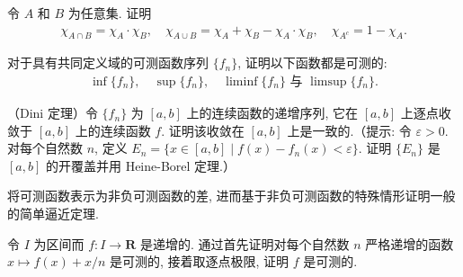 \documentclass[../../main.tex]{subfiles}
\begin{document}
\begin{exercise}\label{exercise:ch03-20}
令 $A$ 和 $B$ 为任意集. 证明
\begin{align*}
\chi_{A\cap B}=\chi_{A}\cdot\chi_{B},\quad\chi_{A\cup B}=\chi_{A}+\chi_{B}-\chi_{A}\cdot\chi_{B},\quad\chi_{A^{c}}=1-\chi_{A}.
\end{align*}
\end{exercise}

\begin{exercise}\label{exercise:ch03-21}
对于具有共同定义域的可测函数序列 $\{f_{n}\}$, 证明以下函数都是可测的:
\begin{align*}
\inf\{f_{n}\},\quad\sup\{f_{n}\},\quad\liminf\{f_{n}\}\text{ 与 }\limsup\{f_{n}\}.
\end{align*}
\end{exercise}

\begin{exercise}\label{exercise:ch03-22}
（Dini 定理）令 $\{f_{n}\}$ 为 $[a,b]$ 上的连续函数的递增序列, 它在 $[a,b]$ 上逐点收敛于 $[a,b]$ 上的连续函数 $f$. 证明该收敛在 $[a,b]$ 上是一致的.（提示: 令 $\varepsilon>0$. 对每个自然数 $n$, 定义 $E_{n}=\{x\in[a,b]\mid f(x)-f_{n}(x)<\varepsilon\}$. 证明 $\{E_{n}\}$ 是 $[a,b]$ 的开覆盖并用 Heine-Borel 定理.）
\end{exercise}

\begin{exercise}\label{exercise:ch03-23}
将可测函数表示为非负可测函数的差, 进而基于非负可测函数的特殊情形证明一般的简单逼近定理.
\end{exercise}

\begin{exercise}\label{exercise:ch03-24}
令 $I$ 为区间而 $f:I\to\mathbf{R}$ 是递增的. 通过首先证明对每个自然数 $n$ 严格递增的函数 $x\mapsto f(x)+x/n$ 是可测的, 接着取逐点极限, 证明 $f$ 是可测的.
\end{exercise}
\end{document}
